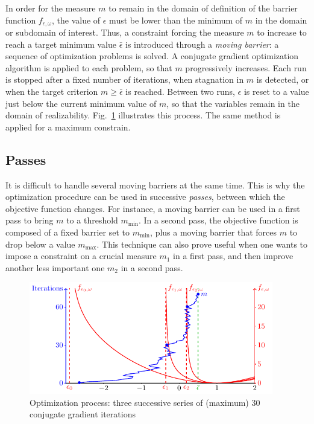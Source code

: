 \documentclass[12pt,a4paper,a4wide]{article}
\begin{document}
In order for the measure $m$ to remain in the domain of definition of
the barrier function $f_{\epsilon,\omega}$, the value of $\epsilon$ must
be lower than the minimum of $m$ in the domain or subdomain of interest.
Thus, a constraint forcing the measure $m$ to increase to reach a target
minimum value $\bar{\epsilon}$ is introduced through a \emph{moving
barrier}: a sequence of optimization problems is solved. A conjugate
gradient optimization algorithm is applied to each problem, so that $m$
progressively increases. Each run is stopped after a fixed number of
iterations, when stagnation in $m$ is detected, or when the target
criterion $m\geq\bar{\epsilon}$ is reached. Between two runs, $\epsilon$
is reset to a value just below the current minimum value of $m$, so that
the variables remain in the domain of realizability.
Fig.~\ref{fig:opti_process} illustrates this process. The same method
is applied for a maximum constrain.


\subsection{Passes}

It is difficult to handle several moving barriers at the same
time. This is why the optimization procedure can be
used in successive \emph{passes}, between which the objective function
changes. For instance, a moving barrier can be used in a first pass to
bring $m$ to a threshold $m_{\min}$. In a second pass, the objective
function is composed of a fixed barrier set to $m_{\min}$, plus a moving
barrier that forces $m$ to drop below a value $m_{\max}$. This technique
can also prove useful when one wants to impose a constraint on a crucial
measure $m_1$ in a first pass, and then improve another less important
one $m_2$ in a second pass.

\begin{figure}
\centering
\includegraphics[width=0.95\textwidth]{opti_process/opti_process}
\caption{Optimization process: three successive series of
(maximum) 30 conjugate gradient iterations\label{fig:opti_process}}
\end{figure}
\end{document}
